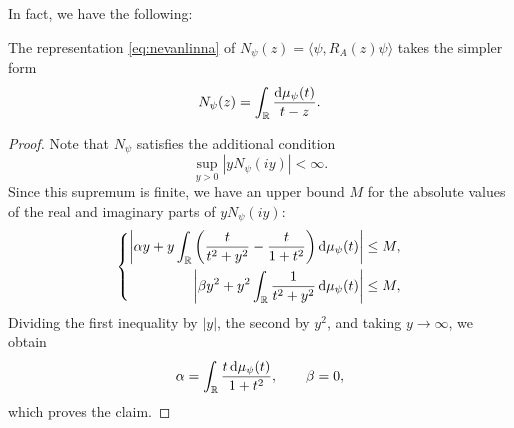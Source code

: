 
In fact, we have the following:
\begin{proposition}
  The representation \eqref{eq:nevanlinna} of
  \(N_\psi(z)=\langle\psi,R_A(z)\psi\rangle\) takes the simpler form
  \begin{equation}
    N_\psi(z)
    =
    \int_{\mathbb{R}}^{} \frac{\mathop{}\!\mathrm{d}\mu_\psi(t)}{t - z}.
  \end{equation}
\end{proposition}
\begin{proof}
  Note that \(N_\psi\) satisfies the additional condition
  \begin{equation}
    \sup_{y>0} |yN_\psi(iy)|<\infty.
  \end{equation}
  Since this supremum is finite, we have an upper bound \(M\)
  for the absolute values of the real and imaginary parts of
  \(yN_\psi(iy)\):
  \begin{equation}
    \left\{
      \begin{aligned}
        \left| \alpha y + y \int_{\mathbb{R}}^{}
        \left(
          \frac{t}{t^{2}+y^{2}}-\frac{t}{1+t^{2}}
        \right) \mathop{}\!\mathrm{d}\mu_\psi(t)
        \right| &\leq M,
        \\
        \left| \beta y^{2}
          + y^{2}\int_{\mathbb{R}}^{} \frac{1}{t^{2}+y^{2}} \mathop{}\!\mathrm{d}\mu_\psi(t)
        \right| &\leq M,
      \end{aligned}
    \right.
  \end{equation}
  Dividing the first inequality by \(|y|\), the second by \(y^{2}\), and
  taking \(y\to\infty\), we obtain
  \begin{equation}
    \alpha = \int_{\mathbb{R}}^{} \frac{t\mathop{}\!\mathrm{d}\mu_\psi(t)}{1+t^{2}},
    \qquad
    \beta = 0,
  \end{equation}
  which proves the claim.
\end{proof}

